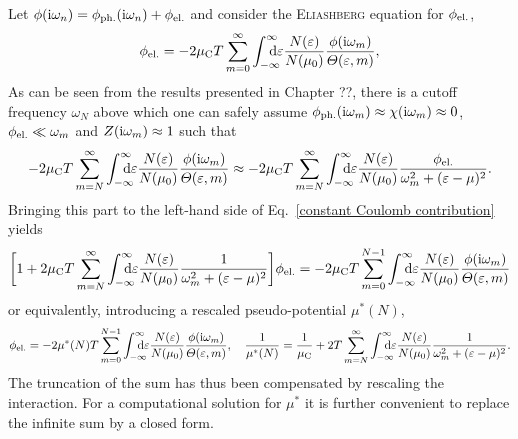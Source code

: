 Let $\phi(\mathrm i \omega_n) = \phi \sb{\text{ph.}} (\mathrm i \omega_n) + \phi \sb{\text{el.}}$ and
consider the \textsc{Eliashberg} equation for $\phi \sb{\text{el.}}$,
%
\begin{equation} \label{constant Coulomb contribution}
    \phi \sub{el.} = -2 \mu \sub C T \sum_{m = 0}^\infty
    \int \from{-\infty} \till \infty \D \epsilon
    \frac{N(\epsilon)}{N(\mu_0)}
    \frac{\phi(\I \omega_m)}{\Theta(\epsilon, m)},
\end{equation}
%
As can be seen from the results presented in Chapter ??, there is a cutoff
frequency $\omega_N$ above which one can safely assume $\phi \sb{\text{ph.}} (\mathrm i
\omega_m) \approx \chi(\mathrm i \omega_m) \approx 0$, $\phi \sb{\text{el.}} \ll \omega_m$
and $Z(\mathrm i \omega_m) \approx 1$ such that
%
\begin{equation*}
    -2 \mu \sub C T \sum_{m = N}^\infty
    \int \from{-\infty} \till \infty \D \epsilon
    \frac{N(\epsilon)}{N(\mu_0)}
    \frac{\phi(\I \omega_m)}{\Theta(\epsilon, m)}
    \approx -2 \mu \sub C T \sum_{m = N}^\infty
    \int \from{-\infty} \till \infty \D \epsilon
    \frac{N(\epsilon)}{N(\mu_0)}
    \frac{\phi \sub{el.}}{\omega_m^2 + (\epsilon - \mu)^2}.
\end{equation*}
%
Bringing this part to the left-hand side of Eq.~\ref{constant Coulomb contribution} yields
%
\begin{equation*}
    \bigg[
        1 + 2 \mu \sub C T \sum_{m = N}^\infty
        \int \from{-\infty} \till \infty \D \epsilon
        \frac{N(\epsilon)}{N(\mu_0)}
        \frac 1 {\omega_m^2 + (\epsilon - \mu)^2}
    \bigg]
    \phi \sub{el.} =
    -2 \mu \sub C T \sum_{m = 0}^{N - 1}
    \int \from{-\infty} \till \infty \D \epsilon
    \frac{N(\epsilon)}{N(\mu_0)}
    \frac{\phi(\I \omega_m)}{\Theta(\epsilon, m)}
\end{equation*}
%
or equivalently, introducing a rescaled pseudo-potential $\mu^*(N)$,
%
\begin{equation*}
    \phi \sub{el.} =
    -2 \mu^*(N) T \sum_{m = 0}^{N - 1}
    \int \from{-\infty} \till \infty \D \epsilon
    \frac{N(\epsilon)}{N(\mu_0)}
    \frac{\phi(\I \omega_m)}{\Theta(\epsilon, m)},
    \quad
    \frac 1 {\mu^*(N)} = \frac 1 {\mu \sub C}
    + 2 T \sum_{m = N}^\infty
    \int \from{-\infty} \till \infty \D \epsilon
    \frac{N(\epsilon)}{N(\mu_0)}
    \frac 1 {\omega_m^2 + (\epsilon - \mu)^2}.
\end{equation*}
%
The truncation of the  sum has thus been compensated by
rescaling the  interaction. For a computational solution for
$\mu^*$ it is further convenient to replace the infinite sum by a closed form.
